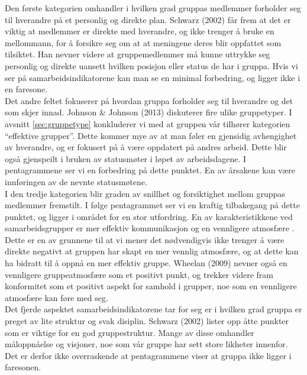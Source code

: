Den første kategorien omhandler i hvilken grad gruppas medlemmer forholder seg til hverandre på et personlig og direkte plan. Schwarz (2002)\citep{fasilitator} får frem at det er viktig at medlemmer er direkte med hverandre, og ikke trenger å bruke en mellommann, for å forsikre seg om at at meningene deres blir oppfattet som tilsiktet. Han nevner videre at gruppemedlemmer må kunne uttrykke seg personlig og direkte uansett hvilken posisjon eller status de har i gruppa. Hvis vi ser på samarbeidsindikatorene kan man se en minimal forbedring, og ligger ikke i en faresone.\\

Det andre feltet fokuserer på hvordan gruppa forholder seg til hverandre og det som skjer innad. Johnson \& Johnson (2013)\citep{gruppeteori} diskuterer fire ulike gruppetyper. I avsnitt \ref{sec:gruppetype} konkluderer vi med at gruppen vår tilhører kategorien ``effektive grupper''. Dette kommer mye av at man føler en gjensidig avhengighet av hverandre, og er fokusert på å være oppdatert på andres arbeid. Dette blir også gjenspeilt i bruken av statusmøter i løpet av arbeidsdagene. I pentagrammene ser vi en forbedring på dette punktet. En av årsakene kan være innføringen av de nevnte statusmøtene.\\

I den tredje kategorien blir graden av snillhet og forsiktighet mellom gruppas medlemmer fremstilt. I følge pentagrammet ser vi en kraftig tilbakegang på dette punktet, og ligger i området for en stor utfordring. En av karakteristikkene ved samarbeidsgrupper er mer effektiv kommunikasjon og en vennligere atmosfære \citep{fasilitator}. Dette er en av grunnene til at vi mener det nødvendigvis ikke trenger å være direkte negativt at gruppen har skapt en mer vennlig atmosfære, og at dette kan ha bidratt til å oppnå en mer effektiv gruppe. Wheelan (2009)\citep{effectiveTeams} nevner også en vennligere gruppeatmosfære som et positivt punkt, og trekker videre fram konformitet som et positivt aspekt for samhold i grupper, noe som en vennligere atmosfære kan føre med seg.\\

Det fjerde aspektet samarbeidsindikatorene tar for seg er i hvilken grad gruppa er preget av lite struktur og svak disiplin. Schwarz (2002)\citep{fasilitator} lister opp åtte punkter som er viktige for en god gruppestruktur. Mange av disse omhandler måloppnåelse og visjoner, noe som vår gruppe har sett store likheter innenfor. Det er derfor ikke overraskende at pentagrammene viser at gruppa ikke ligger i faresonen.\\

